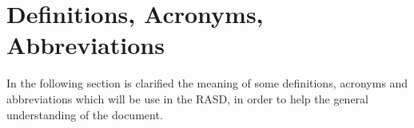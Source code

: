 \section{Definitions, Acronyms, Abbreviations}

In the following section is clarified the meaning of some definitions, acronyms and abbreviations which will be use in the RASD, in order to help the general understanding of the document.




